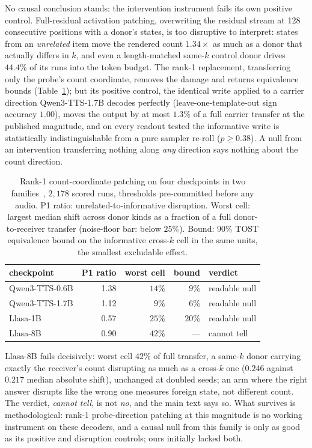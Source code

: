 No causal conclusion stands: the intervention instrument fails its own
positive control. Full-residual activation patching, overwriting the
residual stream at 128 consecutive positions with a donor's states, is
too disruptive to interpret: states from an \emph{unrelated} item move
the rendered count $1.34\times$ as much as a donor that actually
differs in $k$, and even a length-matched same-$k$ control donor drives
$44.4\%$ of its runs into the token budget. The rank-1 replacement,
transferring only the probe's count coordinate, removes the damage and
returns equivalence bounds (Table~\ref{tab:causal-bounds}); but its
positive control, the identical write applied to a carrier direction
Qwen3-TTS-1.7B decodes perfectly (leave-one-template-out sign accuracy
$1.00$), moves the output by at most $1.3\%$ of a full carrier transfer
at the published magnitude, and on every readout tested the informative
write is statistically indistinguishable from a pure sampler re-roll
($p \ge 0.38$). A null from an intervention transferring nothing along
\emph{any} direction says nothing about the count direction.

\begin{table}[htbp]
\centering
\caption{Rank-1 count-coordinate patching on four checkpoints in two
families~\cite{ye2025llasa,hu2026qwen3tts}, $2{,}178$ scored runs,
thresholds pre-committed before any audio. P1 ratio:
unrelated-to-informative disruption. Worst cell: largest median shift
across donor kinds as a fraction of a full donor-to-receiver transfer
(noise-floor bar: below $25\%$). Bound: $90\%$ TOST equivalence bound
on the informative cross-$k$ cell in the same units, the smallest
excludable effect.}
\label{tab:causal-bounds}
\small
\begin{tabular}{@{}lrrrl@{}}
\toprule
checkpoint & P1 ratio & worst cell & bound & verdict \\
\midrule
Qwen3-TTS-0.6B & 1.38 & $14\%$ & $9\%$  & readable null \\
Qwen3-TTS-1.7B & 1.12 & $9\%$  & $6\%$  & readable null \\
Llasa-1B       & 0.57 & $25\%$ & $20\%$ & readable null \\
Llasa-8B       & 0.90 & $42\%$ & ---    & cannot tell \\
\bottomrule
\end{tabular}
\end{table}

Llasa-8B fails decisively: worst cell $42\%$ of full transfer, a
same-$k$ donor carrying exactly the receiver's count disrupting as much
as a cross-$k$ one ($0.246$ against $0.217$ median absolute shift),
unchanged at doubled seeds; an arm where the right answer disrupts like
the wrong one measures foreign state, not different count. The verdict,
\emph{cannot tell}, is not \emph{no}, and the main text says so. What
survives is methodological: rank-1 probe-direction patching at this
magnitude is no working instrument on these decoders, and a causal null
from this family is only as good as its positive and disruption
controls; ours initially lacked both.
